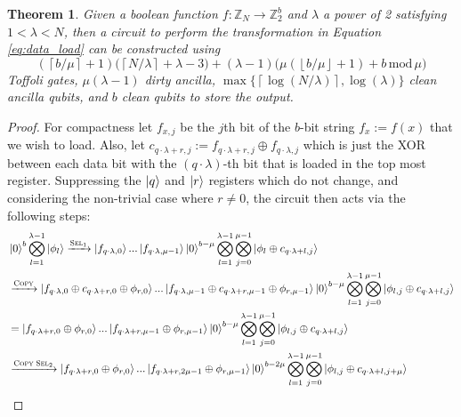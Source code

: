 \documentclass[a4paper, amsfonts, amssymb, amsmath, reprint, showkeys, twoside,superscriptaddress, onecolumn, nofootinbib]{revtex4-2}
\newtheorem{theorem}{Theorem}
\newcommand{\ceil}[1]{\left\lceil #1 \right\rceil}
\newcommand{\floor}[1]{\left\lfloor #1 \right\rfloor}
\begin{document}
\begin{theorem}\label{thm:mu_bit_qrom}
    Given a boolean function $f :  \mathbb{Z}_N \to \mathbb{Z}_2^b$ and $\lambda$ a power of 2 satisfying $1 < \lambda < N$, then a circuit to perform the transformation in Equation \ref{eq:data_load} can be constructed using 
    \begin{equation} \label{eq:non_2_cost}
        (\ceil{b/\mu}+1)\Bigr(\ceil{N/\lambda}+\lambda -3 \Bigr) + (\lambda-1)\Bigr( \mu (\floor{b/\mu}+1) +b \, \mathrm{mod}\, \mu \Bigr)
    \end{equation}
    Toffoli gates, $\mu(\lambda-1)$ dirty ancilla, $\max\{\ceil{\log(N/\lambda )}, \log(\lambda)\}$ clean ancilla qubits, and $b$ clean qubits to store the output.
\end{theorem}
\begin{proof}
    For compactness let $f_{x,j}$ be the $j$th bit of the $b$-bit string $f_x:=f(x)$ that we wish to load. Also, let $c_{q\cdot \lambda+r,j}:= f_{q\cdot \lambda+r,j}\oplus f_{q\cdot \lambda,j}$ which is just the XOR between each data bit with the $(q\cdot  \lambda)$-th bit that is loaded in the top most register. Suppressing the $\ket q$ and $\ket r$ registers which do not change, and considering the non-trivial case where $r\neq 0$, the circuit then acts via the following steps:
    \begin{align}
    &\ket 0^b \bigotimes_{l=1}^{\lambda-1} \ket{\phi_l} \xrightarrow[]{\textsc{Sel}_1} \ket{f_{q\cdot \lambda,0}}...\ket{f_{q\cdot \lambda,\mu-1}} \ket 0^{b-\mu} \bigotimes_{l=1}^{\lambda-1} \bigotimes_{j=0}^{\mu-1} \ket{\phi_l \oplus c_{q\cdot \lambda +l,j}} \\
    &\xrightarrow[]{\textsc{Copy}} \ket{f_{q\cdot \lambda,0} \oplus c_{q\cdot \lambda +r,0} \oplus \phi_{r,0}}...\ket{f_{q\cdot \lambda,\mu-1} \oplus c_{q\cdot \lambda +r,\mu-1} \oplus \phi_{r,\mu-1}} \ket 0^{b-\mu} \bigotimes_{l=1}^{\lambda-1} \bigotimes_{j=0}^{\mu-1} \ket{\phi_{l,j} \oplus c_{q\cdot \lambda +l,j}} \\
    &= \ket{ f_{q\cdot \lambda +r,0} \oplus \phi_{r,0}}...\ket{f_{q\cdot \lambda +r,\mu-1}\oplus \phi_{r,\mu-1}} \ket 0^{b-\mu} \bigotimes_{l=1}^{\lambda-1} \bigotimes_{j=0}^{\mu-1} \ket{\phi_{l,j} \oplus c_{q\cdot \lambda +l,j}}  \\
    & \xrightarrow[]{ \textsc{Copy} \;\textsc{Sel}_2} \ket{f_{q\cdot \lambda +r,0} \oplus \phi_{r,0}}...\ket{f_{q\cdot \lambda +r,2\mu-1}\oplus \phi_{r,\mu-1}}  \ket 0^{b-2\mu} \bigotimes_{l=1}^{\lambda-1} \bigotimes_{j=0}^{\mu-1} \ket{\phi_{l,j} \oplus c_{q\cdot \lambda +l,j+\mu}} \\

\end{align}
\end{proof}
\end{document}
